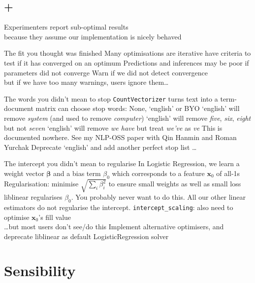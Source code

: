 \documentclass[aspectratio=169, 22pt]{beamer}
\newcommand{\hl}{\textcolor{usydred}}
\newenvironment{sectionslide}
			{\subsection*{+}\begin{frame}[fragile,environment=sectionslide]\vfill\begin{center}\Large}
			{\end{center}\vfill\end{frame}}
\begin{document}
\begin{sectionslide}
	Experimenters report sub-optimal results\\
	because they assume our implementation is nicely behaved
\end{sectionslide}

\begin{points}{The fit you thought was finished}
	\p Many optimisations are iterative
	\p have criteria to test if it has converged on an optimum
	\p Predictions and inferences may be poor if parameters did not converge
	\p[Solution] Warn if we did not detect convergence \\
	but if we have too many warnings, users ignore them\ldots
\end{points}

\begin{points}{The words you didn't mean to stop}
	\p \verb|CountVectorizer| turns text into a term-document matrix
	\p can choose stop words: None, `english' or BYO
	\p `english' will remove \emph{system} (and used to remove \emph{computer})
	\p `english' will remove \emph{five}, \emph{six}, \emph{eight} but not \emph{seven}
	\p `english' will remove \emph{we have} but treat \emph{we've} as \emph{ve}
	\p This is documented nowhere.
	\p See my NLP-OSS paper with Qin Hanmin and Roman Yurchak
	\pause
	\p[Solution] Deprecate `english' 
	\pause and add another \hl{perfect} stop list \ldots
\end{points}

\begin{points}{The intercept you didn't mean to regularise}
	\p In Logistic Regression, we learn a weight vector $\mathbf{\beta}$
	\p and a bias term $\beta_0$ which corresponds to a feature $\mathbf{x}_0$ of all-1s
	\p Regularisation: minimise $\sqrt{\sum_i \beta_i^2}$ to ensure small weights as well as small loss 
	\p liblinear regularises $\beta_0$. You probably never want to do this.
	\p All our other linear estimators do not regularise the intercept.
	\pause
	\p[Sol'n 1] \verb|intercept_scaling|: also need to optimise $\mathbf{x}_0$'s fill value\\
	\pause
	\ldots but most users don't see/do this
	\p[Sol'n 2] Implement alternative optimisers, and deprecate liblinear as default LogisticRegression solver
\end{points}

\section{Sensibility}
\end{document}
